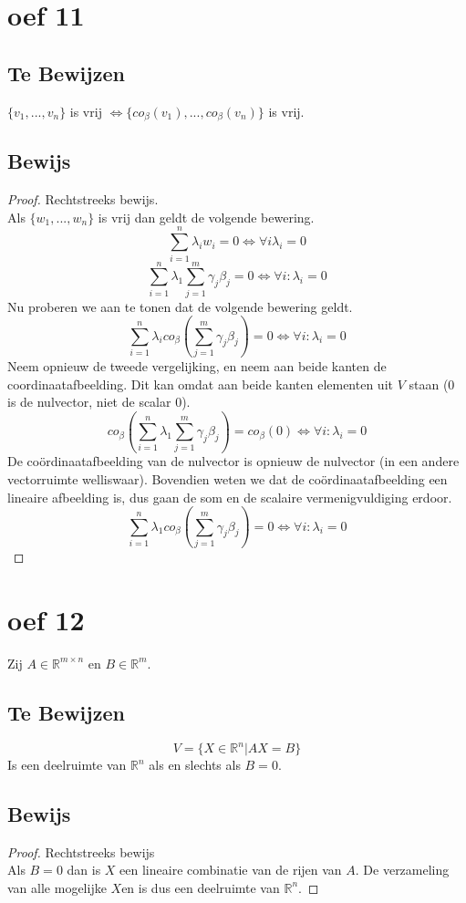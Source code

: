 \documentclass[lineaire_algebra_oplossingen.tex]{subfiles}
\begin{document}
\section{oef 11}
\subsection*{Te Bewijzen}
$\{v_1,...,v_n\}$ is vrij $\Leftrightarrow \{co_{\beta}(v_1),...,co_{\beta}(v_n)\}$ is vrij.
\subsection*{Bewijs}
\begin{proof}
Rechtstreeks bewijs.\\
Als $\{w_1,...,w_n\}$ is vrij dan geldt de volgende bewering.
\[\sum_{i=1}^n\lambda_iw_i = 0 \Leftrightarrow \forall i \lambda_i = 0\]
\[
\sum_{i=1}^n \lambda_1\sum_{j=1}^m\gamma_j\beta_j = 0 \Leftrightarrow \forall i:\lambda_i=0
\]
Nu proberen we aan te tonen dat de volgende bewering geldt.
\[
\sum_{i=1}^n \lambda_i co_\beta\left(\sum_{j=1}^m\gamma_j\beta_j\right) = 0 \Leftrightarrow \forall i:\lambda_i=0
\]
Neem opnieuw de tweede vergelijking, en neem aan beide kanten de coordinaatafbeelding. Dit kan omdat aan beide kanten elementen uit $V$ staan ($0$ is de nulvector, niet de scalar $0$).
\[
co_{\beta}\left(\sum_{i=1}^n \lambda_1\sum_{j=1}^m\gamma_j\beta_j\right) = co_{\beta}(0) \Leftrightarrow \forall i:\lambda_i=0
\]
De co\"ordinaatafbeelding van de nulvector is opnieuw de nulvector (in een andere vectorruimte welliswaar). Bovendien weten we dat de co\"ordinaatafbeelding een lineaire afbeelding is, dus gaan de som en de scalaire vermenigvuldiging erdoor.
\[
\sum_{i=1}^n \lambda_1 co_{\beta}\left(\sum_{j=1}^m\gamma_j\beta_j\right) = 0 \Leftrightarrow \forall i:\lambda_i=0
\]
\end{proof}

\section{oef 12}
Zij $A \in \mathbb{R}^{m\times n}$ en $B \in \mathbb{R}^m$.
\subsection*{Te Bewijzen}
\[
V = \{ X \in \mathbb{R}^n | AX = B\}
\]
Is een deelruimte van $\mathbb{R}^n$ als en slechts als $B=0$.
\subsection*{Bewijs}
\begin{proof}
Rechtstreeks bewijs\\
Als $B=0$ dan is $X$ een lineaire combinatie van de rijen van $A$. De verzameling van alle mogelijke $X$en is dus een deelruimte van $\mathbb{R}^n$.
\end{proof}
\end{document}
